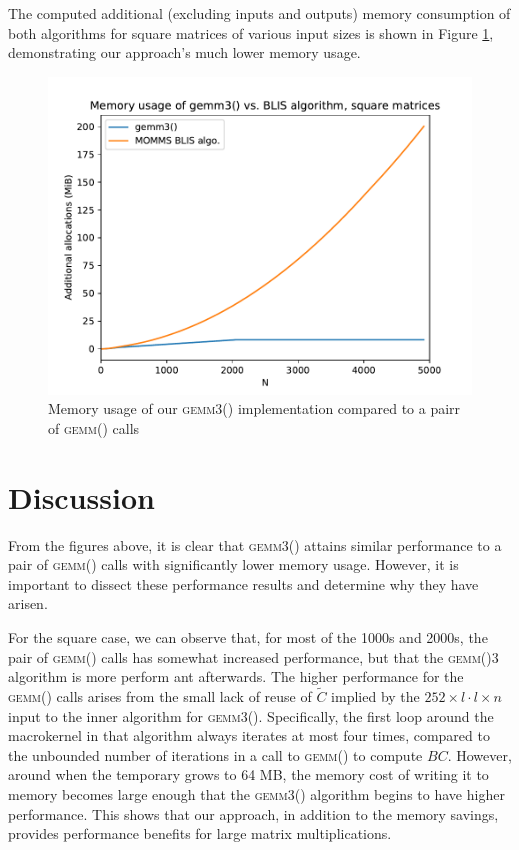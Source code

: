 \documentclass[12pt]{article}
\newcommand*{\gemmt}{{\textsc{gemm3()}}}
\newcommand*{\gemm}{{\textsc{gemm()}}}
\begin{document}
The computed additional (excluding inputs and outputs) memory consumption of both algorithms for square matrices of various input sizes is shown in Figure \ref{fig:bc_square_mem}, demonstrating our approach's much lower memory usage.
\begin{figure}
  \centering
  \includegraphics[height=0.4\textheight]{../results/earwig2/gemm3_memory}
  \caption{Memory usage of our \gemmt{} implementation compared to a pairr of \gemm{} calls}
  \label{fig:bc_square_mem}
\end{figure}

\section{Discussion}
From the figures above, it is clear that \gemmt{} attains similar performance to a pair of \gemm{} calls with significantly lower memory usage.
However, it is important to dissect these performance results and determine why they have arisen.

For the square case, we can observe that, for most of the 1000s and 2000s, the pair of \gemm{} calls has somewhat increased performance, but that the \gemm3{} algorithm is more perform ant afterwards.
The higher performance for the \gemm{} calls arises from the small lack of reuse of $\tilde{C}$ implied by the $252 \times l \cdot l \times n$ input to the inner algorithm for \gemmt{}.
Specifically, the first loop around the macrokernel in that algorithm always iterates at most four times, compared to the unbounded number of iterations in a call to \gemm{} to compute $BC$.
However, around when the temporary grows to 64 MB, the memory cost of writing it to memory becomes large enough that the \gemmt{} algorithm begins to have higher performance.
This shows that our approach, in addition to the memory savings, provides performance benefits for large matrix multiplications.
\end{document}
